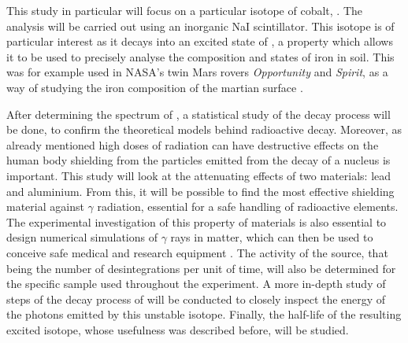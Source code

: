 This study in particular will focus on a particular isotope of cobalt, \cobalt.
The analysis will be carried out using an inorganic NaI scintillator.
This isotope is of particular interest as it decays into an excited state of \iron, a property which allows it to be used to precisely analyse the composition and states of iron in soil.
This was for example used in NASA's twin Mars rovers \emph{Opportunity} and \emph{Spirit}, as a way of studying the iron composition of the martian surface \cite{klingelhofer_mossbauer_2004} \cite{schroder_mossbauer_2015}.

After determining the spectrum of \cobalt, a statistical study of the decay process will be done, to confirm the theoretical models behind radioactive decay.
Moreover, as already mentioned high doses of radiation can have destructive effects on the human body
shielding from the particles emitted from the decay of a nucleus is important.
This study will look at the attenuating effects of two materials: lead and aluminium. From this, it will be possible to find the most effective shielding material against \(\gamma\) radiation, essential for a safe handling of radioactive elements.
The experimental investigation of this property of materials is also essential to design numerical simulations of $\gamma$ rays in matter, which can then be used to conceive safe medical and research equipment \cite{sukara_simulation_2017}.
The activity of the source, that being the number of desintegrations per unit of time, will also be determined for the specific \cobalt sample used throughout the experiment.
A more in-depth study of steps of the decay process of \cobalt will be conducted to closely inspect the energy of the photons emitted by this unstable isotope.
Finally, the half-life of the resulting excited \iron isotope, whose usefulness was described before, will be studied.
